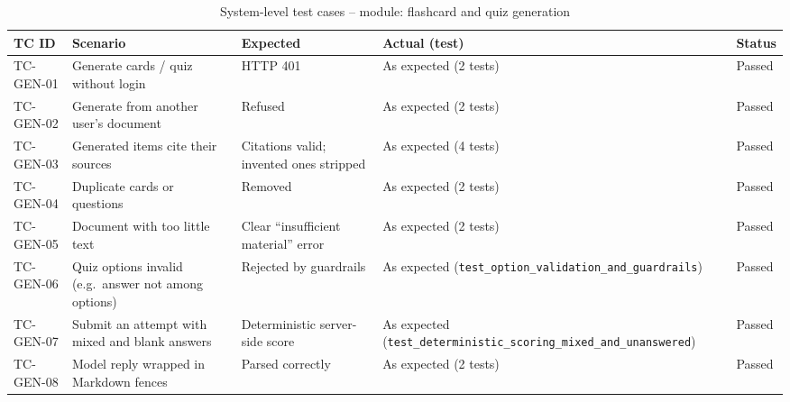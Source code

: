 \begin{table}[!htbp]
\centering
\caption{System-level test cases -- module: flashcard and quiz generation}\label{tab:tc_gen}
\tcbody
\begin{tabularx}{\textwidth}{@{}l Y Y Y l@{}}
\toprule
\textbf{TC ID} & \textbf{Scenario} & \textbf{Expected} & \textbf{Actual (test)} & \textbf{Status}\\
\midrule
TC-GEN-01 & Generate cards / quiz without login & HTTP 401 & As expected (2 tests) & Passed\\
TC-GEN-02 & Generate from another user's document & Refused & As expected (2 tests) & Passed\\
TC-GEN-03 & Generated items cite their sources & Citations valid; invented ones stripped & As expected (4 tests) & Passed\\
TC-GEN-04 & Duplicate cards or questions & Removed & As expected (2 tests) & Passed\\
TC-GEN-05 & Document with too little text & Clear ``insufficient material'' error & As expected (2 tests) & Passed\\
TC-GEN-06 & Quiz options invalid (e.g.\ answer not among options) & Rejected by guardrails & As expected (\texttt{test\_option\_validation\_and\_guardrails}) & Passed\\
TC-GEN-07 & Submit an attempt with mixed and blank answers & Deterministic server-side score & As expected (\texttt{test\_deterministic\_scoring\_mixed\_and\_unanswered}) & Passed\\
TC-GEN-08 & Model reply wrapped in Markdown fences & Parsed correctly & As expected (2 tests) & Passed\\
\bottomrule
\end{tabularx}
\end{table}

